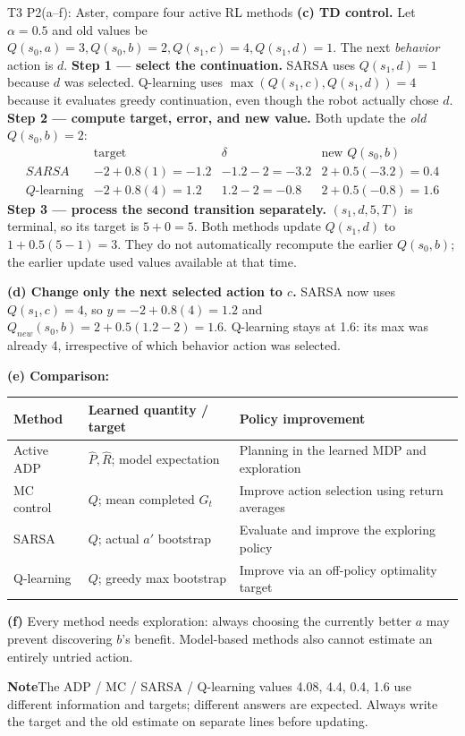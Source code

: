 \documentclass[10pt,a4paper]{article}
\newcommand{\pit}{\par\smallskip\textbf{\color{warn}Note\quad}}
\begin{document}
\begin{question}{T3 P2(a--f): Aster, compare four active RL methods}
\textbf{(c) TD control.} Let $\alpha=0.5$ and old values be $Q(s_0,a)=3,Q(s_0,b)=2,Q(s_1,c)=4,Q(s_1,d)=1$. The next \emph{behavior} action is $d$.
\textbf{Step 1 --- select the continuation.} SARSA uses $Q(s_1,d)=1$ because $d$ was selected. Q-learning uses $\max(Q(s_1,c),Q(s_1,d))=4$ because it evaluates greedy continuation, even though the robot actually chose $d$.
\textbf{Step 2 --- compute target, error, and new value.} Both update the \emph{old} $Q(s_0,b)=2$:
\[
\begin{array}{l|rrr}
&\text{target}&\delta&\text{new }Q(s_0,b)\\\hline
SARSA&-2+0.8(1)=-1.2&-1.2-2=-3.2&2+0.5(-3.2)=\boxed{0.4}\\
Q\text{-learning}&-2+0.8(4)=1.2&1.2-2=-0.8&2+0.5(-0.8)=\boxed{1.6}
\end{array}
\]
\textbf{Step 3 --- process the second transition separately.} $(s_1,d,5,T)$ is terminal, so its target is $5+0=5$. Both methods update $Q(s_1,d)$ to $1+0.5(5-1)=3$. They do not automatically recompute the earlier $Q(s_0,b)$; the earlier update used values available at that time.

\textbf{(d) Change only the next selected action to $c$.} SARSA now uses $Q(s_1,c)=4$, so $y=-2+0.8(4)=1.2$ and $Q_{new}(s_0,b)=2+0.5(1.2-2)=1.6$. Q-learning stays at 1.6: its max was already 4, irrespective of which behavior action was selected.

\textbf{(e) Comparison:}
\small
\par\smallskip
\begin{tabularx}{\linewidth}{@{}P{2.2cm}Y Y@{}}
\toprule Method & Learned quantity / target & Policy improvement \\\midrule
Active ADP & $\hat P,\hat R$; model expectation & Planning in the learned MDP and exploration \\
MC control & $Q$; mean completed $G_t$ & Improve action selection using return averages \\
SARSA & $Q$; actual $a'$ bootstrap & Evaluate and improve the exploring policy \\
Q-learning & $Q$; greedy max bootstrap & Improve via an off-policy optimality target \\\bottomrule
\end{tabularx}\par\smallskip
\normalsize
\textbf{(f)} Every method needs exploration: always choosing the currently better $a$ may prevent discovering $b$'s benefit. Model-based methods also cannot estimate an entirely untried action.
\pit The ADP / MC / SARSA / Q-learning values 4.08, 4.4, 0.4, 1.6 use different information and targets; different answers are expected. Always write the target and the old estimate on separate lines before updating.
\end{question}
\end{document}
